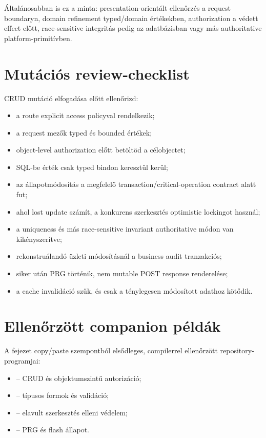 Általánosabban is ez a minta: presentation-orientált ellenőrzés a request boundaryn, domain refinement typed/domain értékekben, authorization a védett effect előtt, race-sensitive integritás pedig az adatbázisban vagy más authoritative platform-primitívben.

\section{Mutációs review-checklist}

CRUD mutáció elfogadása előtt ellenőrizd:

\begin{itemize}
  \item a route explicit access policyval rendelkezik;
  \item a request mezők typed és bounded értékek;
  \item object-level authorization előtt betöltöd a célobjectet;
  \item SQL-be érték csak typed bindon keresztül kerül;
  \item az állapotmódosítás a megfelelő transaction/critical-operation contract alatt fut;
  \item ahol lost update számít, a konkurens szerkesztés optimistic lockingot használ;
  \item a uniqueness és más race-sensitive invariant authoritative módon van kikényszerítve;
  \item rekonstruálandó üzleti módosításnál a business audit tranzakciós;
  \item siker után PRG történik, nem mutable POST response renderelése;
  \item a cache invalidáció szűk, és csak a ténylegesen módosított adathoz kötődik.
\end{itemize}

\section{Ellenőrzött companion példák}
A fejezet copy/paste szempontból elsődleges, compilerrel ellenőrzött repository-programjai:
\begin{itemize}
  \item {} -- CRUD és objektumszintű autorizáció;
  \item {} -- típusos formok és validáció;
  \item {} -- elavult szerkesztés elleni védelem;
  \item {} -- PRG és flash állapot.
\end{itemize}

